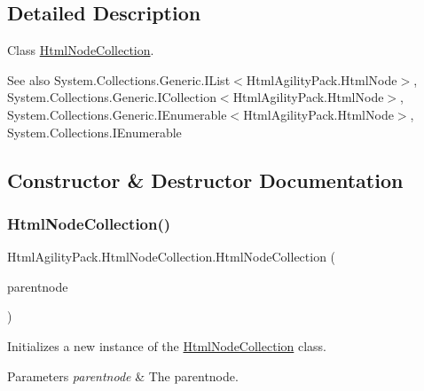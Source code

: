 \subsection{Detailed Description}
Class \hyperlink{class_html_agility_pack_1_1_html_node_collection}{Html\+Node\+Collection}. 

\begin{DoxySeeAlso}{See also}
System.\+Collections.\+Generic.\+I\+List$<$\+Html\+Agility\+Pack.\+Html\+Node$>$, System.\+Collections.\+Generic.\+I\+Collection$<$\+Html\+Agility\+Pack.\+Html\+Node$>$, System.\+Collections.\+Generic.\+I\+Enumerable$<$\+Html\+Agility\+Pack.\+Html\+Node$>$, System.\+Collections.\+I\+Enumerable


\end{DoxySeeAlso}


\subsection{Constructor \& Destructor Documentation}
\mbox{\label{class_html_agility_pack_1_1_html_node_collection_a3b0736683185fe0aad9b71478da4ba3d}} 
\subsubsection{\texorpdfstring{Html\+Node\+Collection()}{HtmlNodeCollection()}}
{\footnotesize\ttfamily Html\+Agility\+Pack.\+Html\+Node\+Collection.\+Html\+Node\+Collection (\begin{DoxyParamCaption}\item[{\hyperlink{class_html_agility_pack_1_1_html_node}{Html\+Node}}]{parentnode }\end{DoxyParamCaption})\hspace{0.3cm}{\ttfamily [inline]}}



Initializes a new instance of the \hyperlink{class_html_agility_pack_1_1_html_node_collection}{Html\+Node\+Collection} class. 


\begin{DoxyParams}{Parameters}
{\em parentnode} & The parentnode.\\
\hline
\end{DoxyParams}


